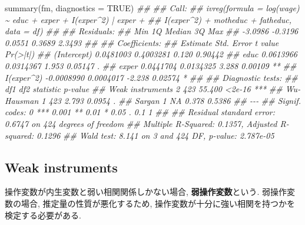 \documentclass[
  letterpaper,
  xelatex,
  ja=standard, xelatex]{bxjsbook}
\newenvironment{Shaded}{\begin{snugshade}}{\end{snugshade}}
\newcommand{\AttributeTok}[1]{\textcolor[rgb]{0.40,0.45,0.13}{#1}}
\newcommand{\ConstantTok}[1]{\textcolor[rgb]{0.56,0.35,0.01}{#1}}
\newcommand{\DocumentationTok}[1]{\textcolor[rgb]{0.37,0.37,0.37}{\textit{#1}}}
\newcommand{\FunctionTok}[1]{\textcolor[rgb]{0.28,0.35,0.67}{#1}}
\newcommand{\NormalTok}[1]{\textcolor[rgb]{0.00,0.23,0.31}{#1}}
\begin{document}
\begin{Shaded}
\begin{Highlighting}[]
\FunctionTok{summary}\NormalTok{(fm, }\AttributeTok{diagnostics =} \ConstantTok{TRUE}\NormalTok{)}
\DocumentationTok{\#\# }
\DocumentationTok{\#\# Call:}
\DocumentationTok{\#\# ivreg(formula = log(wage) \textasciitilde{} educ + exper + I(exper\^{}2) | exper + }
\DocumentationTok{\#\#     I(exper\^{}2) + motheduc + fatheduc, data = df)}
\DocumentationTok{\#\# }
\DocumentationTok{\#\# Residuals:}
\DocumentationTok{\#\#     Min      1Q  Median      3Q     Max }
\DocumentationTok{\#\# {-}3.0986 {-}0.3196  0.0551  0.3689  2.3493 }
\DocumentationTok{\#\# }
\DocumentationTok{\#\# Coefficients:}
\DocumentationTok{\#\#               Estimate Std. Error t value Pr(\textgreater{}|t|)   }
\DocumentationTok{\#\# (Intercept)  0.0481003  0.4003281   0.120  0.90442   }
\DocumentationTok{\#\# educ         0.0613966  0.0314367   1.953  0.05147 . }
\DocumentationTok{\#\# exper        0.0441704  0.0134325   3.288  0.00109 **}
\DocumentationTok{\#\# I(exper\^{}2)  {-}0.0008990  0.0004017  {-}2.238  0.02574 * }
\DocumentationTok{\#\# }
\DocumentationTok{\#\# Diagnostic tests:}
\DocumentationTok{\#\#                  df1 df2 statistic p{-}value    }
\DocumentationTok{\#\# Weak instruments   2 423    55.400  \textless{}2e{-}16 ***}
\DocumentationTok{\#\# Wu{-}Hausman         1 423     2.793  0.0954 .  }
\DocumentationTok{\#\# Sargan             1  NA     0.378  0.5386    }
\DocumentationTok{\#\# {-}{-}{-}}
\DocumentationTok{\#\# Signif. codes:  0 \textquotesingle{}***\textquotesingle{} 0.001 \textquotesingle{}**\textquotesingle{} 0.01 \textquotesingle{}*\textquotesingle{} 0.05 \textquotesingle{}.\textquotesingle{} 0.1 \textquotesingle{} \textquotesingle{} 1}
\DocumentationTok{\#\# }
\DocumentationTok{\#\# Residual standard error: 0.6747 on 424 degrees of freedom}
\DocumentationTok{\#\# Multiple R{-}Squared: 0.1357,  Adjusted R{-}squared: 0.1296 }
\DocumentationTok{\#\# Wald test: 8.141 on 3 and 424 DF,  p{-}value: 2.787e{-}05}
\end{Highlighting}
\end{Shaded}

\subsection{Weak instruments}\label{weak-instruments}

操作変数が内生変数と弱い相関関係しかない場合, \textbf{弱操作変数}という.
弱操作変数の場合, 推定量の性質が悪化するため,
操作変数が十分に強い相関を持つかを検定する必要がある.
\end{document}
